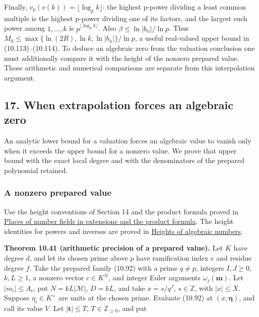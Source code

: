 \documentclass[
  11pt,
  a4paper,
]{article}
\begin{document}
Finally, \(v_p(v(k))=\lfloor\log_p k\rfloor\): the highest p-power
dividing a least common multiple is the highest p-power dividing one of
its factors, and the largest such power among \(1,\ldots,k\) is
\(p^{\lfloor\log_pk\rfloor}\). Also \(\beta\le\ln|b_n|/\ln p\). Thus
\(M_0\le\max\{\ln(2R),\ln k,\ln|b_n|\}/\ln p\), a useful real-valued
upper bound in (10.113)--(10.114). To deduce an algebraic zero from the
valuation conclusion one must additionally compare it with the height of
the nonzero prepared value. Those arithmetic and numerical comparisons
are separate from this interpolation argument.

\subsection{17. When extrapolation forces an algebraic
zero}\label{when-extrapolation-forces-an-algebraic-zero}

An analytic lower bound for a valuation forces an algebraic value to
vanish only when it exceeds the upper bound for a nonzero value. We
prove that upper bound with the exact local degree and with the
denominators of the prepared polynomial retained.

\subsubsection{A nonzero prepared value}\label{a-nonzero-prepared-value}

Use the height conventions of Section 14 and the product formula proved
in \href{../../NT-LOC/NT-LOC-05.html}{Places of number fields in
extensions and the product formula}. The height identities for powers
and inverses are proved in
\href{../../TR-TRANS/TR-TRANS-02.html\#3-the-arithmetic-normalization-and-the-weil-height}{Heights
of algebraic numbers}.

\textbf{Theorem 10.41 (arithmetic precision of a prepared value).} Let
\(K\) have degree \(d\), and let its chosen prime above \(p\) have
ramification index \(e\) and residue degree \(f\). Take the prepared
family (10.92) with a prime \(q\ne p\), integers \(I,J\ge0\),
\(k,L\ge1\), a nonzero vector \(c\in K^N\), and integer Euler arguments
\(\omega_j(\boldsymbol m)\). Let \(|m_i|\le A_i\), put
\(N=kL|\mathcal M|\), \(D=kL\), and take \(x=s/q^J\), \(s\in\mathbb Z\),
with \(|x|\le X\). Suppose \(\eta_i\in K^\times\) are units at the
chosen prime. Evaluate (10.92) at \((x,\boldsymbol\eta)\), and call its
value \(V\). Let \(|\boldsymbol t|\le T\), \(T\in\mathbb Z_{\ge0}\), and
put
\end{document}
